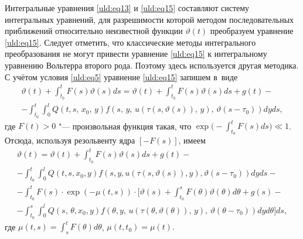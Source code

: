 Интегральные уравнения \eqref{uld:eq13} и \eqref{uld:eq15} составляют систему интегральных уравнений, %
для разрешимости которой методом последовательных приближений относительно неизвестной функции $\vartheta  (t)$
преобразуем уравнение \eqref{uld:eq15}. Следует отметить, что классические методы интегрального преобразования не могут привести уравнение \eqref{uld:eq15} к интегральному уравнению Вольтерра второго рода.
Поэтому здесь используется другая методика. С учётом условия \eqref{uld:eq5} уравнение \eqref{uld:eq15} запишем в~виде \cite{uld:bib6}
\begin{multline*}
\vartheta  (t)+\int_{t_0}^t F (s)  \vartheta
 (s) d s= \vartheta  (t)+\int_{t_0}^t
F (s)  \vartheta  (s) d s+g (t)-
\\
-\int_{t_0}^t \int_0^l Q (t, s,\,x_0,\,y) f \left(s,\,y,\,u (\tau(s,\vartheta(s)),\,y),\,
\vartheta  (s-\tau_0) \right) dy ds,
\end{multline*}
где $F (t)>0$ "--- произвольная функция такая, что $\displaystyle \exp\biggl(-\int_{t_0}^t F (s) d s \biggr) \ll1$.
Отсюда, используя резольвенту ядра $[- F (s)]$, имеем
\begin{multline}
\label{uld:eq17}
\vartheta  (t)=\vartheta  (t)+\int_{t_0}^t F (s) \vartheta  (s) d s+g (t)-
\\
-\int_{t_0}^t \int_0^l Q (t,s,x_0,y) f \left(s,y,u  (\tau  (s, \vartheta
(s)),y), \vartheta (s-\tau _0) \right)dy ds- 
\\
-\int_{t_0}^t F (s) \cdot \exp  \left(- \mu (t, s) \right)\cdot \biggl[\vartheta
 (s)+\int_{t_0}^s F (\theta )  \vartheta  (\theta) d \theta +g (s)- 
 \\
 -\int_{t_0}^s \int_0^l Q (s,\,\theta , x_0 , y) f \left( \theta
 , y,\,u  (\tau  (\theta, \vartheta  (\theta
)),\,y),\,\vartheta  (\theta -\tau _0) \right)  dy d\theta \biggr] ds,
\end{multline}
где $\displaystyle \mu (t, s)=\int_s^t F (\theta )  d \theta$, $\mu(t, t_0)=\mu(t).$

